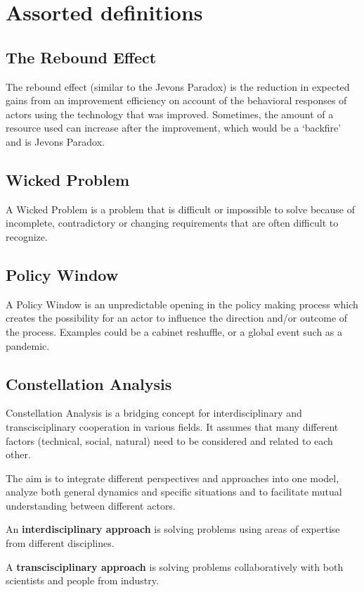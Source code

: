\section{Assorted definitions}

\subsection{The Rebound Effect}

The rebound effect (similar to the Jevons Paradox) is the reduction in
expected gains from an improvement efficiency on account of the
behavioral responses of actors using the technology that was
improved. Sometimes, the amount of a resource used can increase after
the improvement, which would be a `backfire' and is Jevons Paradox.

\subsection{Wicked Problem}

A Wicked Problem is a problem that is difficult or impossible to solve
because of incomplete, contradictory or changing requirements that are
often difficult to recognize.

\subsection{Policy Window}

A Policy Window is an unpredictable opening in the policy making
process which creates the possibility for an actor to influence the
direction and/or outcome of the process. Examples could be a cabinet
reshuffle, or a global event such as a pandemic.

\subsection{Constellation Analysis}

Constellation Analysis is a bridging concept for interdisciplinary and
transcisciplinary cooperation in various fields. It assumes that many
different factors (technical, social, natural) need to be considered
and related to each other.

The aim is to integrate different perspectives and approaches into one
model, analyze both general dynamics and specific situations and to
facilitate mutual understanding between different actors.

An \textbf{interdisciplinary approach} is solving problems using areas
of expertise from different disciplines.

A \textbf{transcisciplinary approach} is solving problems
collaboratively with both scientists and people from industry.

